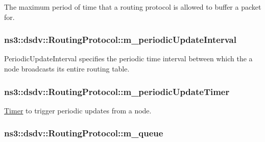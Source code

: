 The maximum period of time that a routing protocol is allowed to buffer a packet for. 

\subsubsection[{\texorpdfstring{m\+\_\+periodic\+Update\+Interval}{m_periodicUpdateInterval}}]{ ns3\+::dsdv\+::\+Routing\+Protocol\+::m\+\_\+periodic\+Update\+Interval\hspace{0.3cm}{\ttfamily [private]}}\hypertarget{classns3_1_1dsdv_1_1RoutingProtocol_a1951a29aaca9beebdff3abd5c7d00ef0}{}\label{classns3_1_1dsdv_1_1RoutingProtocol_a1951a29aaca9beebdff3abd5c7d00ef0}
Periodic\+Update\+Interval specifies the periodic time interval between which the a node broadcasts its entire routing table. 
\subsubsection[{\texorpdfstring{m\+\_\+periodic\+Update\+Timer}{m_periodicUpdateTimer}}]{ ns3\+::dsdv\+::\+Routing\+Protocol\+::m\+\_\+periodic\+Update\+Timer\hspace{0.3cm}{\ttfamily [private]}}\hypertarget{classns3_1_1dsdv_1_1RoutingProtocol_a851fbb5569e6681fd1c42f47d2a79ee8}{}\label{classns3_1_1dsdv_1_1RoutingProtocol_a851fbb5569e6681fd1c42f47d2a79ee8}


\hyperlink{classns3_1_1Timer}{Timer} to trigger periodic updates from a node. 

\subsubsection[{\texorpdfstring{m\+\_\+queue}{m_queue}}]{ ns3\+::dsdv\+::\+Routing\+Protocol\+::m\+\_\+queue\hspace{0.3cm}{\ttfamily [private]}}\hypertarget{classns3_1_1dsdv_1_1RoutingProtocol_a3ed623ade7d7244ed1ff5e0f6a399a68}{}\label{classns3_1_1dsdv_1_1RoutingProtocol_a3ed623ade7d7244ed1ff5e0f6a399a68}



